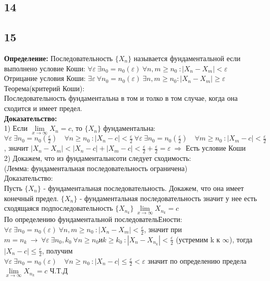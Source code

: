 		
		\subsection{14}
		
		\subsection{15}
		\textbf{Определение:} Последовательность $\{X_n\}$ называется фундаментальной если выполнено условие
		Коши: $ \forall \varepsilon \ \exists n_0 = n_0(\varepsilon) \ \forall n,m \geqslant n_0 \ :|X_n - X_m| < \varepsilon $\\
		Отрицание условия Коши: $ \exists \varepsilon \ \forall n_0 = n_0(\varepsilon) \ \exists n,m \geqslant n_0 :|X_n - X_m| \geqslant \varepsilon $\\
		Теорема(критерий Коши):\\
		Последовательность фундаментальна в том и толко в том случае, когда она сходится и имеет предел.\\
		\textbf{Доказательство:}\\
		1) Если $\lim\limits_{x\to \infty} X_n = c$, то $\{X_n\}$ фундаментальна:\\
		$ \forall \varepsilon \ \exists n_0 = n_0(\frac{\varepsilon}{2}) \quad \forall n \geqslant n_0 \ :|X_n - c| < \frac{\varepsilon}{2} \ \forall \varepsilon \ \exists n_0 = n_0(\frac{\varepsilon}{2}) \quad \forall m \geqslant n_0 \ :|X_m - c| < \frac{\varepsilon}{2} $, значит $|X_n - X_m| < |X_n - c| + |X_m - c| < \frac{\varepsilon}{2} + \frac{\varepsilon}{2} = \varepsilon \ \Rightarrow$ Есть условие Коши\\
		2) Докажем, что из фундаментальнсоти следует сходимость:\\
		(Лемма: фундаментальная последовательность ограничена)\\
		Доказательство:\\
		Пусть $\{X_n\}$ - фундаментальная последовательность. Докажем, что она имеет конечный предел. $\{X_n\}$ - фундаментальная последовательность значит у нее есть сходящаяся подпоследовательность $ \{X_{n_k}\} \ \lim\limits_{x\to \infty} X_{n_k} = c$ \\
		По определению фундаментальной последовательЕности: $ \forall \varepsilon \ \exists n_0 = n_0(\varepsilon) \ \forall n,m \geqslant n_0 \ :|X_n - X_m| < \frac{\varepsilon}{2}$, значит при $ m = n_k \ \rightarrow\ \forall \varepsilon \ \exists n_0,k_0 \ \forall n \geqslant n_0 \text{и} k \geqslant k_0 \ :|X_n - X_{n_k}| < \frac{\varepsilon}{2}$ (устремим k к $\infty$), тогда $|X_n - c| \leqslant \frac{\varepsilon}{2}$, получим\\
		$ \forall \varepsilon \ \exists n_0 = n_0(\varepsilon) \quad \forall n \geqslant n_0 \ :|X_n - c| \leqslant \frac{\varepsilon}{2} < \varepsilon$ значит по определению предела \ $\lim\limits_{x\to \infty} X_{n_k} = c$ Ч.Т.Д
		
